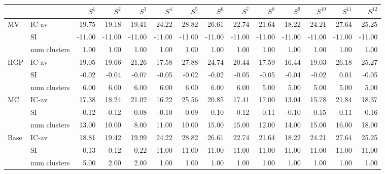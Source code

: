 \begin{tabular}{llrrrrrrrrrrrr}
\toprule
 &  & $S^{1}$ & $S^{2}$ & $S^{3}$ & $S^{4}$ & $S^{5}$ & $S^{6}$ & $S^{7}$ & $S^{8}$ & $S^{9}$ & $S^{10}$ & $S^{11}$ & $S^{12}$ \\
\midrule
\multirow[c]{3}{*}{MV} & IC-av & 19.75 & 19.18 & 19.41 & 24.22 & 28.82 & 26.61 & 22.74 & 21.64 & 18.22 & 24.21 & 27.64 & 25.25 \\
 & SI & -11.00 & -11.00 & -11.00 & -11.00 & -11.00 & -11.00 & -11.00 & -11.00 & -11.00 & -11.00 & -11.00 & -11.00 \\
 & num clusters & 1.00 & 1.00 & 1.00 & 1.00 & 1.00 & 1.00 & 1.00 & 1.00 & 1.00 & 1.00 & 1.00 & 1.00 \\
\multirow[c]{3}{*}{HGP} & IC-av & 19.05 & 19.66 & 21.26 & 17.58 & 27.88 & 24.74 & 20.44 & 17.59 & 16.44 & 19.03 & 26.18 & 25.27 \\
 & SI & -0.02 & -0.04 & -0.07 & -0.05 & -0.02 & -0.02 & -0.05 & -0.05 & -0.04 & -0.02 & 0.01 & -0.05 \\
 & num clusters & 6.00 & 6.00 & 6.00 & 6.00 & 6.00 & 6.00 & 6.00 & 5.00 & 5.00 & 5.00 & 5.00 & 5.00 \\
\multirow[c]{3}{*}{MC} & IC-av & 17.38 & 18.24 & 21.02 & 16.22 & 25.56 & 20.85 & 17.41 & 17.00 & 13.04 & 15.78 & 21.84 & 18.37 \\
 & SI & -0.12 & -0.12 & -0.08 & -0.10 & -0.09 & -0.10 & -0.12 & -0.11 & -0.10 & -0.15 & -0.11 & -0.16 \\
 & num clusters & 13.00 & 10.00 & 8.00 & 11.00 & 10.00 & 15.00 & 15.00 & 12.00 & 14.00 & 15.00 & 16.00 & 18.00 \\
\multirow[c]{3}{*}{Base} & IC-av & 18.81 & 19.42 & 19.99 & 24.22 & 28.82 & 26.61 & 22.74 & 21.64 & 18.22 & 24.21 & 27.64 & 25.25 \\
 & SI & 0.13 & 0.12 & 0.22 & -11.00 & -11.00 & -11.00 & -11.00 & -11.00 & -11.00 & -11.00 & -11.00 & -11.00 \\
 & num clusters & 5.00 & 2.00 & 2.00 & 1.00 & 1.00 & 1.00 & 1.00 & 1.00 & 1.00 & 1.00 & 1.00 & 1.00 \\
\bottomrule
\end{tabular}

